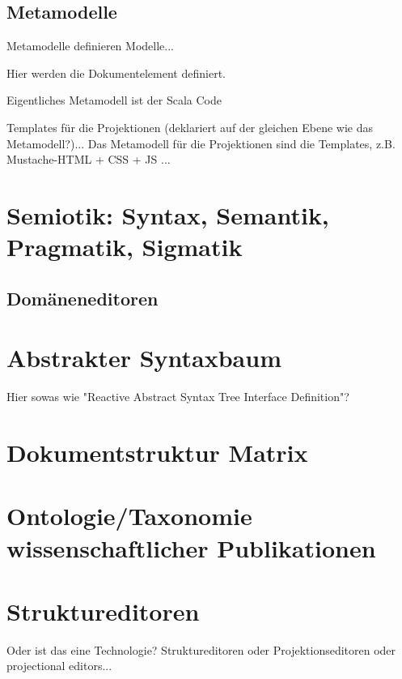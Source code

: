 \subsection{Metamodelle}

Metamodelle definieren Modelle...

Hier werden die Dokumentelement definiert.

Eigentliches Metamodell ist der Scala Code

Templates für die Projektionen (deklariert auf der gleichen Ebene wie das Metamodell?)...
Das Metamodell für die Projektionen sind die Templates, z.B. Mustache-HTML + CSS + JS ...

\section{Semiotik: Syntax, Semantik, Pragmatik, Sigmatik}

\subsection{Domäneneditoren}

\section{Abstrakter Syntaxbaum}\label{sec.ast}

Hier sowas wie "Reactive Abstract Syntax Tree Interface Definition"?

\section{Dokumentstruktur Matrix}

\section{Ontologie/Taxonomie wissenschaftlicher Publikationen}

\section{Struktureditoren}

Oder ist das eine Technologie?
Struktureditoren oder Projektionseditoren oder projectional editors...



